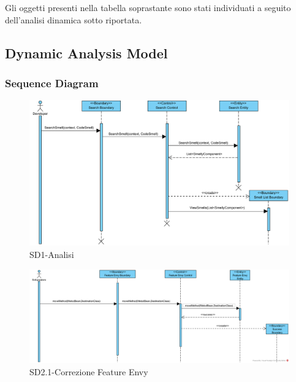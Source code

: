 \documentclass[11pt]{article}
\begin{document}
			
		\flushleft	
			
			\vspace{0.5cm}
			
			\flushleft Gli oggetti presenti nella tabella soprastante sono stati individuati a seguito dell'analisi dinamica sotto riportata.  
			
			\vspace{0.5cm}
			\newpage				
		\subsection{Dynamic Analysis Model}
		
		
	
		
			\subsubsection{Sequence Diagram}
			
				\begin{figure}[h!]
					\includegraphics[width=\columnwidth]{AnalisiCurrentProposed.png}
					\caption{SD1-Analisi}
				\end{figure}
		
				\begin{figure}[h!]
					\includegraphics[width=\columnwidth]{Feature_Envy.png}
					\caption{SD2.1-Correzione Feature Envy}
				\end{figure}
			
\end{document}

